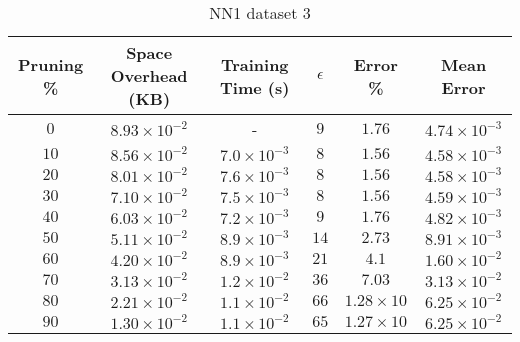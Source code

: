 \begin{adjustwidth}{0cm}{}
\begin{table}
\caption{NN1 dataset 3}\label{pr13}
\begin{tabular}{cccccc}
\hline
\toprule
Pruning \% & Space Overhead (KB) & Training Time (s) & $\epsilon$ & Error \% & Mean Error\\
\midrule
$0$ & $8.93 \times 10^{-2}$ & - & $9$ & $1.76$ & $4.74 \times 10^{-3}$\\
$10$ & $8.56 \times 10^{-2}$ & $7.0 \times 10^{-3}$ & $8$ & $1.56$ & $4.58 \times 10^{-3}$\\
$20$ & $8.01 \times 10^{-2}$ & $7.6 \times 10^{-3}$ & $8$ & $1.56$ & $4.58 \times 10^{-3}$\\
$30$ & $7.10 \times 10^{-2}$ & $7.5 \times 10^{-3}$ & $8$ & $1.56$ & $4.59 \times 10^{-3}$\\
$40$ & $6.03 \times 10^{-2}$ & $7.2 \times 10^{-3}$ & $9$ & $1.76$ & $4.82 \times 10^{-3}$\\
$50$ & $5.11 \times 10^{-2}$ & $8.9 \times 10^{-3}$ & $14$ & $2.73$ & $8.91 \times 10^{-3}$\\
$60$ & $4.20 \times 10^{-2}$ & $8.9 \times 10^{-3}$ & $21$ & $4.1$ & $1.60 \times 10^{-2}$\\
$70$ & $3.13 \times 10^{-2}$ & $1.2 \times 10^{-2}$ & $36$ & $7.03$ & $3.13 \times 10^{-2}$\\
$80$ & $2.21 \times 10^{-2}$ & $1.1 \times 10^{-2}$ & $66$ & $1.28 \times 10$ & $6.25 \times 10^{-2}$\\
$90$ & $1.30 \times 10^{-2}$ & $1.1 \times 10^{-2}$ & $65$ & $1.27 \times 10$ & $6.25 \times 10^{-2}$\\
\bottomrule
\end{tabular}
\end{table}
\end{adjustwidth}

